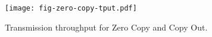 \begin{figure}[t]
\texttt{[image: fig-zero-copy-tput.pdf]}
\caption{Transmission throughput for Zero Copy and Copy Out.}
\label{fig:zero-copy-tput}
\end{figure}
